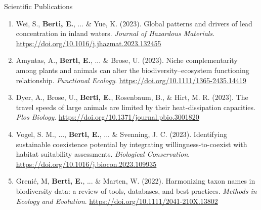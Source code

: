\documentclass{resume} %
\begin{document}
\begin{rSection}{Scientific Publications}
\begin{enumerate}[leftmargin=0pt]
    \item Wei, S., \textbf{Berti, E.}, ... \& Yue, K. (2023). Global patterns and drivers of lead concentration in inland waters. \textit{Journal of Hazardous Materials}. \url{https://doi.org/10.1016/j.jhazmat.2023.132455}
    \item Amyntas, A., \textbf{Berti, E.}, ... \& Brose, U. (2023). Niche complementarity among plants and animals can alter the biodiversity–ecosystem functioning relationship. \textit{Functional Ecology}. \url{https://doi.org/10.1111/1365-2435.14419}
    \item Dyer, A., Brose, U., \textbf{Berti, E.}, Rosenbaum, B., \& Hirt, M. R. (2023). The travel speeds of large animals are limited by their heat-dissipation capacities. \textit{Plos Biology}. \url{https://doi.org/10.1371/journal.pbio.3001820}
    \item Vogel, S. M., ..., \textbf{Berti, E.}, ... \& Svenning, J. C. (2023). Identifying sustainable coexistence potential by integrating willingness-to-coexist with habitat suitability assessments. \textit{Biological Conservation}. \url{https://doi.org/10.1016/j.biocon.2023.109935}
    \item Grenié, M, \textbf{Berti, E.}, ... \& Marten, W. (2022). Harmonizing taxon names in biodiversity data: a review of tools, databases, and best practices. \textit{Methods in Ecology and Evolution}. \url{https://doi.org/10.1111/2041-210X.13802}
\end{enumerate}
\end{rSection}

\end{document}
